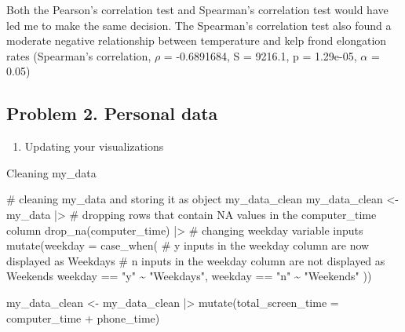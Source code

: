 \documentclass[
  letterpaper,
  DIV=11,
  numbers=noendperiod]{scrartcl}
\newenvironment{Shaded}{\begin{snugshade}}{\end{snugshade}}
\newcommand{\AttributeTok}[1]{\textcolor[rgb]{0.40,0.45,0.13}{#1}}
\newcommand{\CommentTok}[1]{\textcolor[rgb]{0.37,0.37,0.37}{#1}}
\newcommand{\FunctionTok}[1]{\textcolor[rgb]{0.28,0.35,0.67}{#1}}
\newcommand{\NormalTok}[1]{\textcolor[rgb]{0.00,0.23,0.31}{#1}}
\newcommand{\OtherTok}[1]{\textcolor[rgb]{0.00,0.23,0.31}{#1}}
\newcommand{\SpecialCharTok}[1]{\textcolor[rgb]{0.37,0.37,0.37}{#1}}
\newcommand{\StringTok}[1]{\textcolor[rgb]{0.13,0.47,0.30}{#1}}
\providecommand{\tightlist}{%
  \setlength{\itemsep}{0pt}\setlength{\parskip}{0pt}}\usepackage{longtable,booktabs,array}
\begin{document}
Both the Pearson's correlation test and Spearman's correlation test
would have led me to make the same decision. The Spearman's correlation
test also found a moderate negative relationship between temperature and
kelp frond elongation rates (Spearman's correlation, \(\rho\) =
-0.6891684, S = 9216.1, p = 1.29e-05, \(\alpha\) = 0.05)

\subsection{Problem 2. Personal data}\label{problem-2.-personal-data}

\begin{enumerate}
\def\labelenumi{\alph{enumi}.}
\tightlist
\item
  Updating your visualizations\newline
\end{enumerate}

Cleaning my\_data

\begin{Shaded}
\begin{Highlighting}[]
\CommentTok{\# cleaning my\_data and storing it as object my\_data\_clean}
\NormalTok{my\_data\_clean }\OtherTok{\textless{}{-}}\NormalTok{ my\_data }\SpecialCharTok{|\textgreater{}}
  \CommentTok{\# dropping rows that contain NA values in the computer\_time column}
  \FunctionTok{drop\_na}\NormalTok{(computer\_time) }\SpecialCharTok{|\textgreater{}}
  \CommentTok{\# changing weekday variable inputs}
  \FunctionTok{mutate}\NormalTok{(}\AttributeTok{weekday =} \FunctionTok{case\_when}\NormalTok{(}
    \CommentTok{\# y inputs in the weekday column are now displayed as Weekdays}
    \CommentTok{\# n inputs in the weekday column are not displayed as Weekends}
\NormalTok{    weekday }\SpecialCharTok{==} \StringTok{"y"} \SpecialCharTok{\textasciitilde{}} \StringTok{"Weekdays"}\NormalTok{,}
\NormalTok{    weekday }\SpecialCharTok{==} \StringTok{"n"} \SpecialCharTok{\textasciitilde{}} \StringTok{"Weekends"}
\NormalTok{  ))}

\NormalTok{my\_data\_clean }\OtherTok{\textless{}{-}}\NormalTok{ my\_data\_clean }\SpecialCharTok{|\textgreater{}}
  \FunctionTok{mutate}\NormalTok{(}\AttributeTok{total\_screen\_time =}\NormalTok{ computer\_time }\SpecialCharTok{+}\NormalTok{ phone\_time)}
\end{Highlighting}
\end{Shaded}
\end{document}
